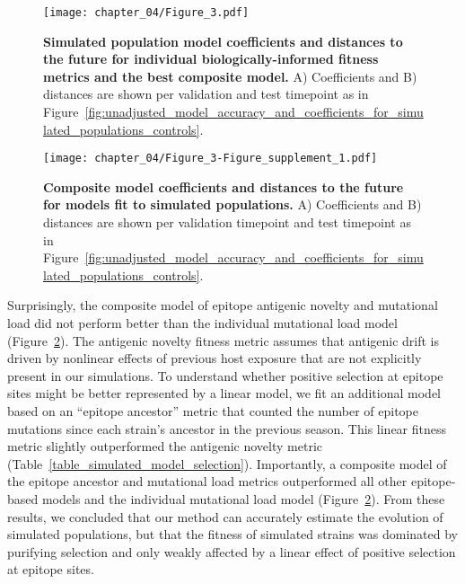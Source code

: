 \begin{figure}
  \texttt{[image: chapter\_04/Figure\_3.pdf]}
  \caption[{Simulated population model coefficients and distances to the future for individual biologically-informed fitness metrics and the best composite model.}]{
    {\bf Simulated population model coefficients and distances to the future for individual biologically-informed fitness metrics and the best composite model.}
    A) Coefficients and B) distances are shown per validation and test timepoint as in Figure~\ref{fig:unadjusted_model_accuracy_and_coefficients_for_simulated_populations_controls}.
  }
  \label{fig:unadjusted_model_accuracy_and_coefficients_for_simulated_populations}
\end{figure}

\begin{figure}
    \texttt{[image: chapter\_04/Figure\_3-Figure\_supplement\_1.pdf]}
    \caption[{Composite model coefficients and distances to the future for models fit to simulated populations.}]{
      {\bf Composite model coefficients and distances to the future for models fit to simulated populations.}
      A) Coefficients and B) distances are shown per validation timepoint and test timepoint as in Figure~\ref{fig:unadjusted_model_accuracy_and_coefficients_for_simulated_populations_controls}.
    }
    \label{fig:unadjusted_composite_model_accuracy_and_coefficients_for_simulated_populations}
\end{figure}

Surprisingly, the composite model of epitope antigenic novelty and mutational load did not perform better than the individual mutational load model (Figure~\ref{fig:unadjusted_composite_model_accuracy_and_coefficients_for_simulated_populations}).
The antigenic novelty fitness metric assumes that antigenic drift is driven by nonlinear effects of previous host exposure \citep{Luksza:2014hj} that are not explicitly present in our simulations.
To understand whether positive selection at epitope sites might be better represented by a linear model, we fit an additional model based on an ``epitope ancestor'' metric that counted the number of epitope mutations since each strain's ancestor in the previous season.
This linear fitness metric slightly outperformed the antigenic novelty metric (Table~\ref{table_simulated_model_selection}).
Importantly, a composite model of the epitope ancestor and mutational load metrics outperformed all other epitope-based models and the individual mutational load model (Figure~\ref{fig:unadjusted_composite_model_accuracy_and_coefficients_for_simulated_populations}).
From these results, we concluded that our method can accurately estimate the evolution of simulated populations, but that the fitness of simulated strains was dominated by purifying selection and only weakly affected by a linear effect of positive selection at epitope sites.

